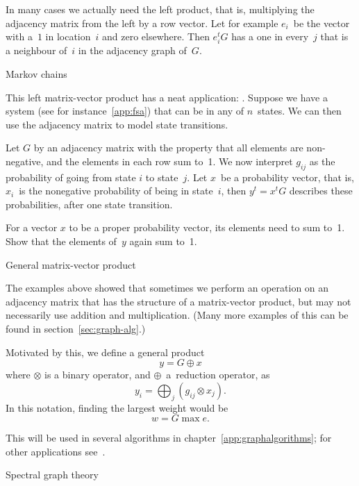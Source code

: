 In many cases we actually need the left product, that is, multiplying
the adjacency matrix from the left by a row vector. Let for example $e_i$~be 
the vector with a~$1$ in location~$i$ and zero elsewhere. Then $e_i^tG$
has a one in every~$j$ that is a neighbour of~$i$ in the adjacency graph of~$G$.

 {Markov chains}

This left matrix-vector product has a neat application: .
Suppose we have a system (see for instance~\ref{app:fsa}) that can be
in any of $n$~states. We can then use the adjacency matrix to model
state transitions.

Let $G$ by an adjacency matrix with the property that all elements are
non-negative, and the elements in each row sum to~1. We now interpret
$g_{ij}$ as the probability of going from state $i$ to state~$j$. Let
$x$~be a probability vector, that is, $x_i$~is the nonegative probability 
of being in state~$i$, then $y^t=x^tG$ describes these probabilities,
after one state transition.

\begin{exercise}
For a vector $x$ to be a proper probability vector, its elements
need to sum to~1. Show that the elements of~$y$ again sum to~1.
\end{exercise}

 {General matrix-vector product}

The examples above showed that sometimes we perform an operation
on an adjacency matrix that has the structure of a matrix-vector product,
but may not necessarily use addition and multiplication. (Many more examples 
of this can be found in section~\ref{sec:graph-alg}.)

Motivated by this, we define a general product
\[ y = G \mathop{\oplus\cdot_\otimes} x \]
where $\otimes$ is a binary operator, and $\oplus$~a~reduction operator,
as
\[ y_i = \bigoplus_j (g_{ij} \otimes x_j ). \]
In this notation, finding the largest weight would be
\[ w= G\mathop{\max\cdot_\times} e. \]

This will be used in several algorithms in chapter~\ref{app:graphalgorithms};
for other applications see~\cite{Kung:pegasus2009}.

 {Spectral graph theory}
\label{app:fiedler}

